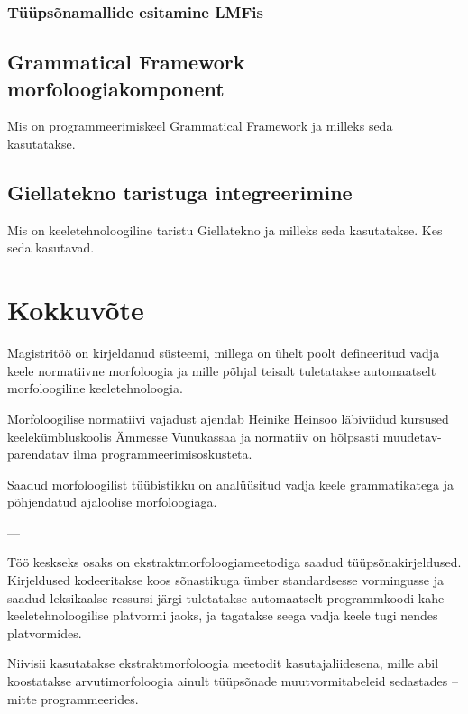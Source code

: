 \documentclass[12pt,a4paper]{article}
\begin{document}
\subsubsection{Tüüpsõnamallide esitamine LMFis}




\subsection{Grammatical Framework morfoloogiakomponent}

Mis on programmeerimiskeel Grammatical Framework ja milleks seda kasutatakse.




\subsection{Giellatekno taristuga integreerimine}

Mis on keeletehnoloogiline taristu Giellatekno ja milleks seda kasutatakse. Kes seda kasutavad.








\newpage
\section{Kokkuvõte}

Magistritöö on kirjeldanud süsteemi, millega on ühelt poolt defineeritud vadja keele normatiivne morfoloogia ja mille põhjal teisalt tuletatakse automaatselt morfoloogiline keeletehnoloogia.

Morfoloogilise normatiivi vajadust ajendab Heinike Heinsoo läbiviidud kursused keelekümbluskoolis Ämmesse Vunukassaa ja normatiiv on hõlpsasti muudetav-parendatav ilma programmeerimisoskusteta.

Saadud morfoloogilist tüübistikku on analüüsitud vadja keele grammatikatega ja põhjendatud ajaloolise morfoloogiaga.

---

Töö keskseks osaks on ekstraktmorfoloogiameetodiga saadud tüüpsõnakirjeldused.
Kirjeldused kodeeritakse koos sõnastikuga ümber standardsesse vormingusse ja saadud leksikaalse ressursi järgi tuletatakse automaatselt programmkoodi kahe keeletehnoloogilise platvormi jaoks, ja tagatakse seega vadja keele tugi nendes platvormides.

Niivisii kasutatakse ekstraktmorfoloogia meetodit kasutaja\-liidesena, mille abil koostatakse arvutimorfoloogia ainult tüüpsõnade muutvormitabeleid sedastades -- mitte programmeerides.
\end{document}
